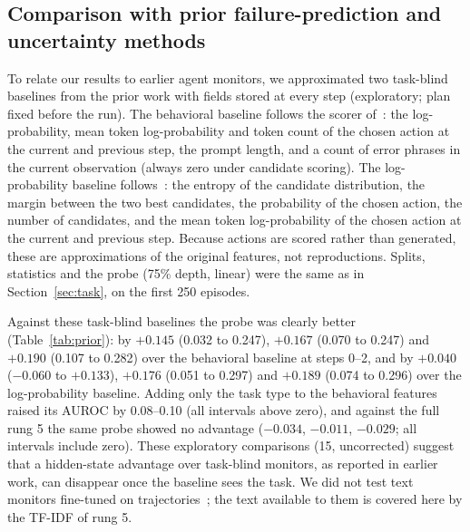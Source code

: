 \documentclass[11pt]{article}
\begin{document}
\subsection{Comparison with prior failure-prediction and uncertainty methods}\label{sec:prior}
To relate our results to earlier agent monitors, we approximated two task-blind baselines from the prior work with fields stored at every step (exploratory; plan fixed before the run).
The behavioral baseline follows the scorer of~\cite{ruan2026doomed}: the log-probability, mean token log-probability and token count of the chosen action at the current and previous step, the prompt length, and a count of error phrases in the current observation (always zero under candidate scoring).
The log-probability baseline follows~\cite{pham2026agentstop}: the entropy of the candidate distribution, the margin between the two best candidates, the probability of the chosen action, the number of candidates, and the mean token log-probability of the chosen action at the current and previous step.
Because actions are scored rather than generated, these are approximations of the original features, not reproductions. Splits, statistics and the probe (75\% depth, linear) were the same as in Section~\ref{sec:task}, on the first 250 episodes.

Against these task-blind baselines the probe was clearly better (Table~\ref{tab:prior}): by $+0.145$ (0.032 to 0.247), $+0.167$ (0.070 to 0.247) and $+0.190$ (0.107 to 0.282) over the behavioral baseline at steps 0--2,
and by $+0.040$ ($-0.060$ to $+0.133$), $+0.176$ (0.051 to 0.297) and $+0.189$ (0.074 to 0.296) over the log-probability baseline. Adding only the task type to the behavioral features raised its AUROC by 0.08--0.10 (all intervals above zero),
and against the full rung 5 the same probe showed no advantage ($-0.034$, $-0.011$, $-0.029$; all intervals include zero). These exploratory comparisons (15, uncorrected) suggest that a hidden-state advantage over task-blind monitors,
as reported in earlier work, can disappear once the baseline sees the task. We did not test text monitors fine-tuned on trajectories~\cite{wang2026failfast}; the text available to them is covered here by the TF-IDF of rung 5.
\end{document}
